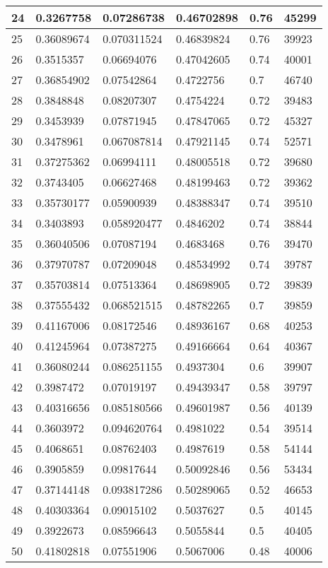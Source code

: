 \begin{longtable}{|l|l|l|l|l|l|}
24 & 0.3267758 & 0.07286738 & 0.46702898 & 0.76 & 45299 \\ \hline 
25 & 0.36089674 & 0.070311524 & 0.46839824 & 0.76 & 39923 \\ \hline 
26 & 0.3515357 & 0.06694076 & 0.47042605 & 0.74 & 40001 \\ \hline 
27 & 0.36854902 & 0.07542864 & 0.4722756 & 0.7 & 46740 \\ \hline 
28 & 0.3848848 & 0.08207307 & 0.4754224 & 0.72 & 39483 \\ \hline 
29 & 0.3453939 & 0.07871945 & 0.47847065 & 0.72 & 45327 \\ \hline 
30 & 0.3478961 & 0.067087814 & 0.47921145 & 0.74 & 52571 \\ \hline 
31 & 0.37275362 & 0.06994111 & 0.48005518 & 0.72 & 39680 \\ \hline 
32 & 0.3743405 & 0.06627468 & 0.48199463 & 0.72 & 39362 \\ \hline 
33 & 0.35730177 & 0.05900939 & 0.48388347 & 0.74 & 39510 \\ \hline 
34 & 0.3403893 & 0.058920477 & 0.4846202 & 0.74 & 38844 \\ \hline 
35 & 0.36040506 & 0.07087194 & 0.4683468 & 0.76 & 39470 \\ \hline 
36 & 0.37970787 & 0.07209048 & 0.48534992 & 0.74 & 39787 \\ \hline 
37 & 0.35703814 & 0.07513364 & 0.48698905 & 0.72 & 39839 \\ \hline 
38 & 0.37555432 & 0.068521515 & 0.48782265 & 0.7 & 39859 \\ \hline 
39 & 0.41167006 & 0.08172546 & 0.48936167 & 0.68 & 40253 \\ \hline 
40 & 0.41245964 & 0.07387275 & 0.49166664 & 0.64 & 40367 \\ \hline 
41 & 0.36080244 & 0.086251155 & 0.4937304 & 0.6 & 39907 \\ \hline 
42 & 0.3987472 & 0.07019197 & 0.49439347 & 0.58 & 39797 \\ \hline 
43 & 0.40316656 & 0.085180566 & 0.49601987 & 0.56 & 40139 \\ \hline 
44 & 0.3603972 & 0.094620764 & 0.4981022 & 0.54 & 39514 \\ \hline 
45 & 0.4068651 & 0.08762403 & 0.4987619 & 0.58 & 54144 \\ \hline 
46 & 0.3905859 & 0.09817644 & 0.50092846 & 0.56 & 53434 \\ \hline 
47 & 0.37144148 & 0.093817286 & 0.50289065 & 0.52 & 46653 \\ \hline 
48 & 0.40303364 & 0.09015102 & 0.5037627 & 0.5 & 40145 \\ \hline 
49 & 0.3922673 & 0.08596643 & 0.5055844 & 0.5 & 40405 \\ \hline 
50 & 0.41802818 & 0.07551906 & 0.5067006 & 0.48 & 40006 \\ \hline 
\end{longtable}